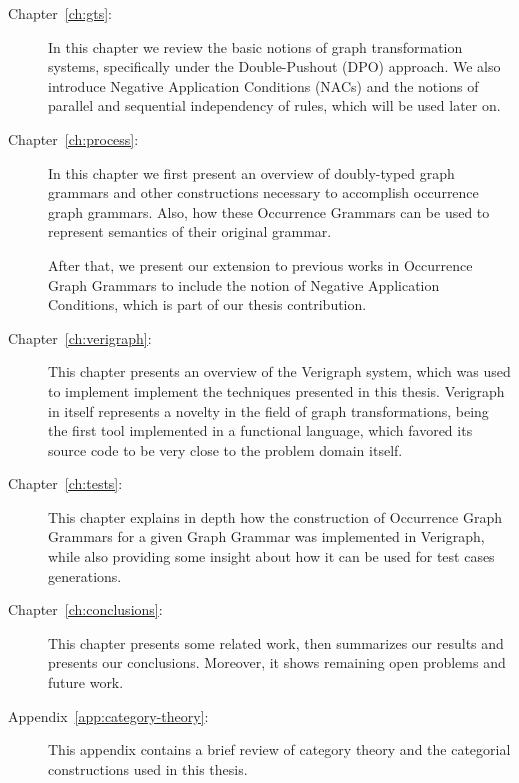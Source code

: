 \begin{description}
	\item[Chapter~\ref{ch:gts}:] In this chapter we review the basic notions of graph transformation systems, specifically under the Double-Pushout (DPO) approach. We also introduce Negative Application Conditions (NACs) and the notions of parallel and sequential independency of rules, which will be used later on.

  \item[Chapter~\ref{ch:process}:] In this chapter we first present an overview of doubly-typed graph grammars and other constructions necessary to accomplish occurrence graph grammars. Also, how these Occurrence Grammars can be used to represent semantics of their original grammar.

    After that, we present our extension to previous works in Occurrence Graph Grammars to include the notion of Negative Application Conditions, which is part of our thesis contribution.

  \item[Chapter~\ref{ch:verigraph}:] This chapter presents an overview of the Verigraph system, which was used to implement implement the techniques presented in this thesis. Verigraph in itself represents a novelty in the field of graph transformations, being the first tool implemented in a functional language, which favored its source code to be very close to the problem domain itself.

  \item[Chapter~\ref{ch:tests}:] This chapter explains in depth how the construction of Occurrence Graph Grammars for a given Graph Grammar was implemented in Verigraph, while also providing some insight about how it can be used for test cases generations. 

  \item[Chapter~\ref{ch:conclusions}:] This chapter presents some related work, then summarizes our results and presents our conclusions. Moreover, it shows remaining open problems and future work.

  \item[Appendix~\ref{app:category-theory}:] This appendix contains a brief review of category theory and the categorial constructions used in this thesis.

\end{description}
